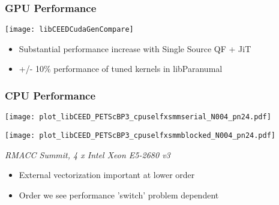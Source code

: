 \documentclass{beamer}
\begin{document}
\begin{frame}
\begin{center}
\frametitle{GPU Performance}

\texttt{[image: libCEEDCudaGenCompare]}\\

\begin{itemize}

\item Substantial performance increase with Single Source QF + JiT

\item +/- 10\% performance of tuned kernels in libParanumal

\end{itemize}

\end{center}
\end{frame}


\begin{frame}
\begin{center}
\frametitle{CPU Performance}

\setlength{\columnsep}{1mm}
\begin{multicols}{2}

\begin{flushleft}
\texttt{[image: plot\_libCEED\_PETScBP3\_cpuselfxsmmserial\_N004\_pn24.pdf]}
\end{flushleft}

\begin{flushright}
\texttt{[image: plot\_libCEED\_PETScBP3\_cpuselfxsmmblocked\_N004\_pn24.pdf]}
\end{flushright}

\end{multicols}

\vspace{-0.5cm}

{\scriptsize \textit{
RMACC Summit, 4 x Intel Xeon E5-2680 v3
}}

\begin{itemize}

\item External vectorization important at lower order

\item Order we see performance 'switch' problem dependent

\end{itemize}

\end{center}
\end{frame}
\end{document}
